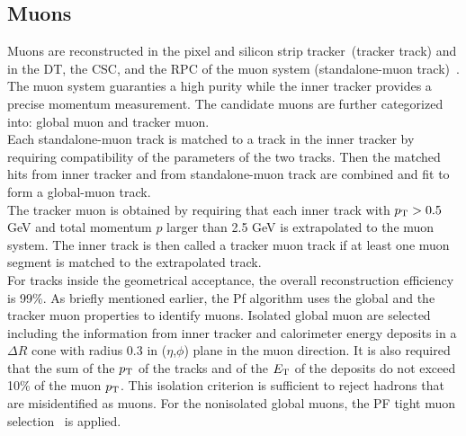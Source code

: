 \subsection{Muons}
\label{sec:PFmuon}
Muons are reconstructed in the pixel and silicon strip tracker~(tracker track) and in the DT, the CSC, and the RPC of the muon system (standalone-muon track)~\cite{muon7TeV}. The muon system guaranties a high purity while the inner tracker provides a precise momentum measurement. The candidate muons are further categorized into: global muon and tracker muon.\\
Each standalone-muon track is matched to a track in the inner tracker by requiring compatibility of the parameters of the two tracks. Then the matched hits from inner tracker and from standalone-muon track are combined and fit to form a global-muon track.\\
The tracker muon is obtained by requiring that each inner track with $p_{\rm T}>0.5$ GeV and total momentum $p$ larger than 2.5 GeV is extrapolated to the muon system. The inner track is then called a tracker muon track if at least one muon segment is matched to the extrapolated track.\\
For tracks inside the geometrical acceptance, the overall reconstruction efficiency is 99\%. 
As briefly mentioned earlier, the Pf algorithm uses the global and the tracker muon properties to identify muons. Isolated global muon are selected including the information from
inner tracker and calorimeter energy deposits in a $\Delta R$ cone with radius 0.3 in ($\eta$,$\phi$) plane in the muon direction. It is also required that the sum of the $p_{\rm T}$ of the tracks and of the $E_{\rm T}$ of the deposits do not exceed 10\% of the muon $p_{\rm T}$. This isolation criterion is sufficient to reject hadrons that are misidentified as muons. For the nonisolated global muons, the PF tight muon selection~\cite{muon7TeV} is applied.
